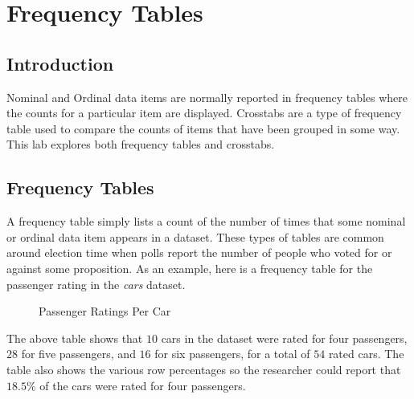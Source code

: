 \chapter{Frequency Tables}\label{fre:frequency_tables}

\section{Introduction}

Nominal and Ordinal data items are normally reported in frequency tables where the counts for a particular item are displayed. Crosstabs are a type of frequency table used to compare the counts of items that have been grouped in some way. This lab explores both frequency tables and crosstabs.

\section{Frequency Tables}

A frequency table simply lists a count of the number of times that some nominal or ordinal data item appears in a dataset. These types of tables are common around election time when polls report the number of people who voted for or against some proposition. As an example, here is a frequency table for the passenger rating in the \textit{cars} dataset.

\begin{figure}[H]
  \begin{center}
    \caption{Passenger Ratings Per Car}
  \end{center}
\end{figure}

The above table shows that $ 10 $ cars in the dataset were rated for four passengers, $ 28 $ for five passengers, and $ 16 $ for six passengers, for a total of $ 54 $ rated cars. The table also shows the various row percentages so the researcher could report that $ 18.5\% $ of the cars were rated for four passengers.


